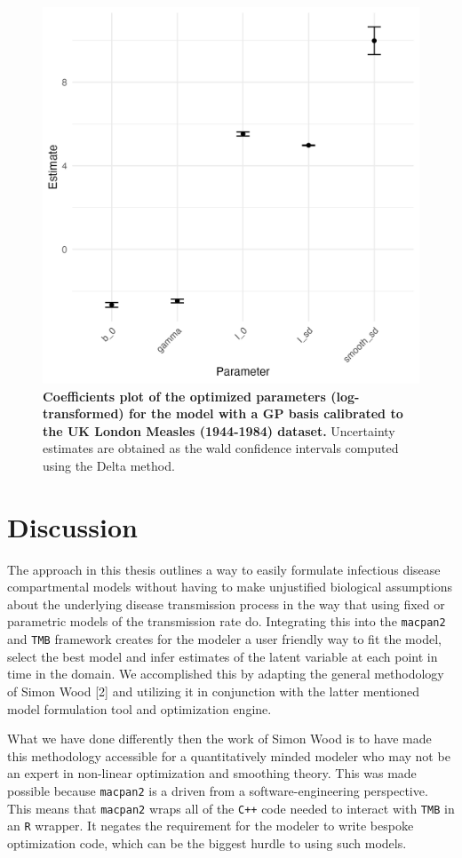 \documentclass[
11pt, %
oneside, %
english, %
singlespacing, %
]{macthesis} %
\begin{document}
\begin{figure}
\centering
\includegraphics[width=\textwidth, height = 0.5\textwidth]{figure/Measles/MeaslesCoefficentsPlot.png}
\caption[Coefficients Plot Measles (1944-1984)]{\textbf{Coefficients plot of the optimized parameters (log-transformed) for the model with a GP basis calibrated to the UK London Measles (1944-1984) dataset.} Uncertainty estimates are obtained as the wald confidence intervals computed using the Delta method.}
\label{fig:Measles_coefs}
\end{figure}

\chapter{Discussion}\label{Discussion}

The approach in this thesis outlines a way to easily formulate infectious disease compartmental models without having to make unjustified biological assumptions about the underlying disease transmission process in the way that using fixed or parametric models of the transmission rate do. Integrating this into the \texttt{macpan2} and \texttt{TMB} framework creates for the modeler a user friendly way to fit the model, select the best model and infer estimates of the latent variable at each point in time in the domain. We accomplished this by adapting the general methodology of Simon Wood {[}2{]} and utilizing it in conjunction with the latter mentioned model formulation tool and optimization engine.

What we have done differently then the work of Simon Wood is to have made this methodology accessible for a quantitatively minded modeler who may not be an expert in non-linear optimization and smoothing theory. This was made possible because \texttt{macpan2} is a driven from a software-engineering perspective. This means that \texttt{macpan2} wraps all of the \texttt{C++} code needed to interact with \texttt{TMB} in an \texttt{R} wrapper. It negates the requirement for the modeler to write bespoke optimization code, which can be the biggest hurdle to using such models.
\end{document}
